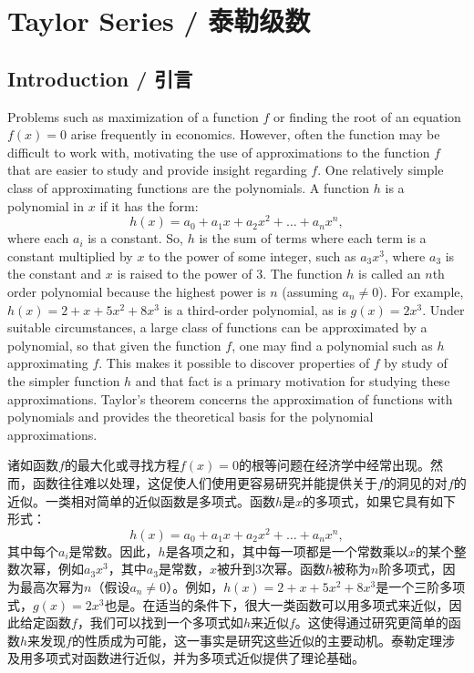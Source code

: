 \section{Taylor Series / 泰勒级数}

\subsection{Introduction / 引言}

\begin{original}
Problems such as maximization of a function $f$ or finding the root of an equation $f(x) = 0$ arise frequently in economics. However, often the function may be difficult to work with, motivating the use of approximations to the function $f$ that are easier to study and provide insight regarding $f$. One relatively simple class of approximating functions are the polynomials. A function $h$ is a polynomial in $x$ if it has the form:
\[
h(x) = a_0 + a_1 x + a_2 x^2 + \dots + a_n x^n,
\]
where each $a_i$ is a constant. So, $h$ is the sum of terms where each term is a constant multiplied by $x$ to the power of some integer, such as $a_3 x^3$, where $a_3$ is the constant and $x$ is raised to the power of 3. The function $h$ is called an $n$th order polynomial because the highest power is $n$ (assuming $a_n \ne 0$). For example, $h(x) = 2 + x + 5x^2 + 8x^3$ is a third-order polynomial, as is $g(x) = 2x^3$. Under suitable circumstances, a large class of functions can be approximated by a polynomial, so that given the function $f$, one may find a polynomial such as $h$ approximating $f$. This makes it possible to discover properties of $f$ by study of the simpler function $h$ and that fact is a primary motivation for studying these approximations. Taylor's theorem concerns the approximation of functions with polynomials and provides the theoretical basis for the polynomial approximations.
\end{original}
\begin{translation}
诸如函数$f$的最大化或寻找方程$f(x) = 0$的根等问题在经济学中经常出现。然而，函数往往难以处理，这促使人们使用更容易研究并能提供关于$f$的洞见的对$f$的近似。一类相对简单的近似函数是多项式。函数$h$是$x$的多项式，如果它具有如下形式：
\[
h(x) = a_0 + a_1 x + a_2 x^2 + \dots + a_n x^n,
\]
其中每个$a_i$是常数。因此，$h$是各项之和，其中每一项都是一个常数乘以$x$的某个整数次幂，例如$a_3 x^3$，其中$a_3$是常数，$x$被升到3次幂。函数$h$被称为$n$阶多项式，因为最高次幂为$n$（假设$a_n \ne 0$）。例如，$h(x) = 2 + x + 5x^2 + 8x^3$是一个三阶多项式，$g(x) = 2x^3$也是。在适当的条件下，很大一类函数可以用多项式来近似，因此给定函数$f$，我们可以找到一个多项式如$h$来近似$f$。这使得通过研究更简单的函数$h$来发现$f$的性质成为可能，这一事实是研究这些近似的主要动机。泰勒定理涉及用多项式对函数进行近似，并为多项式近似提供了理论基础。
\end{translation}

